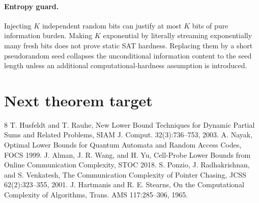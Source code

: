 \documentclass[11pt]{article}
\begin{document}
\paragraph{Entropy guard.}
Injecting \(K\) independent random bits can justify at most \(K\) bits of pure information burden. Making \(K\) exponential by literally streaming exponentially many fresh bits does not prove static SAT hardness. Replacing them by a short pseudorandom seed collapses the unconditional information content to the seed length unless an additional computational-hardness assumption is introduced.

\section*{Next theorem target}

\begin{thebibliography}{8}
 T. Husfeldt and T. Rauhe, New Lower Bound Techniques for Dynamic Partial Sums and Related Problems, SIAM J. Comput. 32(3):736--753, 2003.
 A. Nayak, Optimal Lower Bounds for Quantum Automata and Random Access Codes, FOCS 1999.
 J. Alman, J. R. Wang, and H. Yu, Cell-Probe Lower Bounds from Online Communication Complexity, STOC 2018.
 S. Ponzio, J. Radhakrishnan, and S. Venkatesh, The Communication Complexity of Pointer Chasing, JCSS 62(2):323--355, 2001.
 J. Hartmanis and R. E. Stearns, On the Computational Complexity of Algorithms, Trans. AMS 117:285--306, 1965.
\end{thebibliography}
\end{document}
